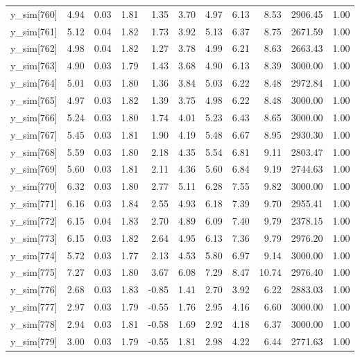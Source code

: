 \begin{table}[ht]
\begin{tabular}{rrrrrrrrrrr}
  y\_sim[760] & 4.94 & 0.03 & 1.81 & 1.35 & 3.70 & 4.97 & 6.13 & 8.53 & 2906.45 & 1.00 \\ 
  y\_sim[761] & 5.12 & 0.04 & 1.82 & 1.73 & 3.92 & 5.13 & 6.37 & 8.75 & 2671.59 & 1.00 \\ 
  y\_sim[762] & 4.98 & 0.04 & 1.82 & 1.27 & 3.78 & 4.99 & 6.21 & 8.63 & 2663.43 & 1.00 \\ 
  y\_sim[763] & 4.90 & 0.03 & 1.79 & 1.43 & 3.68 & 4.90 & 6.13 & 8.39 & 3000.00 & 1.00 \\ 
  y\_sim[764] & 5.01 & 0.03 & 1.80 & 1.36 & 3.84 & 5.03 & 6.22 & 8.48 & 2972.84 & 1.00 \\ 
  y\_sim[765] & 4.97 & 0.03 & 1.82 & 1.39 & 3.75 & 4.98 & 6.22 & 8.48 & 3000.00 & 1.00 \\ 
  y\_sim[766] & 5.24 & 0.03 & 1.80 & 1.74 & 4.01 & 5.23 & 6.43 & 8.65 & 3000.00 & 1.00 \\ 
  y\_sim[767] & 5.45 & 0.03 & 1.81 & 1.90 & 4.19 & 5.48 & 6.67 & 8.95 & 2930.30 & 1.00 \\ 
  y\_sim[768] & 5.59 & 0.03 & 1.80 & 2.18 & 4.35 & 5.54 & 6.81 & 9.11 & 2803.47 & 1.00 \\ 
  y\_sim[769] & 5.60 & 0.03 & 1.81 & 2.11 & 4.36 & 5.60 & 6.84 & 9.19 & 2744.63 & 1.00 \\ 
  y\_sim[770] & 6.32 & 0.03 & 1.80 & 2.77 & 5.11 & 6.28 & 7.55 & 9.82 & 3000.00 & 1.00 \\ 
  y\_sim[771] & 6.16 & 0.03 & 1.84 & 2.55 & 4.93 & 6.18 & 7.39 & 9.70 & 2955.41 & 1.00 \\ 
  y\_sim[772] & 6.15 & 0.04 & 1.83 & 2.70 & 4.89 & 6.09 & 7.40 & 9.79 & 2378.15 & 1.00 \\ 
  y\_sim[773] & 6.15 & 0.03 & 1.82 & 2.64 & 4.95 & 6.13 & 7.36 & 9.79 & 2976.20 & 1.00 \\ 
  y\_sim[774] & 5.72 & 0.03 & 1.77 & 2.13 & 4.53 & 5.80 & 6.97 & 9.14 & 3000.00 & 1.00 \\ 
  y\_sim[775] & 7.27 & 0.03 & 1.80 & 3.67 & 6.08 & 7.29 & 8.47 & 10.74 & 2976.40 & 1.00 \\ 
  y\_sim[776] & 2.68 & 0.03 & 1.83 & -0.85 & 1.41 & 2.70 & 3.92 & 6.22 & 2883.03 & 1.00 \\ 
  y\_sim[777] & 2.97 & 0.03 & 1.79 & -0.55 & 1.76 & 2.95 & 4.16 & 6.60 & 3000.00 & 1.00 \\ 
  y\_sim[778] & 2.94 & 0.03 & 1.81 & -0.58 & 1.69 & 2.92 & 4.18 & 6.37 & 3000.00 & 1.00 \\ 
  y\_sim[779] & 3.00 & 0.03 & 1.79 & -0.55 & 1.81 & 2.98 & 4.22 & 6.44 & 2771.63 & 1.00 \\ 

\end{tabular}
\end{table}
